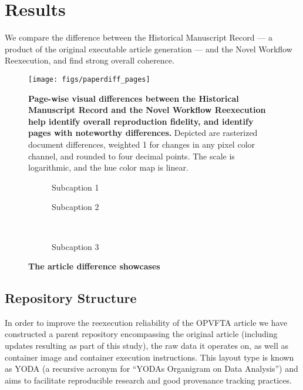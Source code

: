 \section{Results}
We compare the difference between the Historical Manuscript Record — a product of the original executable article generation — and the Novel Workflow Reexecution, and find strong overall coherence.

\begin{figure}
	\centering
	\texttt{[image: figs/paperdiff\_pages]}
	\caption{
		\textbf{Page-wise visual differences between the Historical Manuscript Record and the Novel Workflow Reexecution help identify overall reproduction fidelity, and identify pages with noteworthy differences.}
		Depicted are rasterized document differences, weighted 1 for changes in any pixel color channel, and rounded to four decimal points.
		The scale is logarithmic, and the hue color map is linear.
	}
	\label{fig:paperdiff_pages}
\end{figure}

\begin{figure}
	\centering
	\begin{subfigure}{0.4\textwidth}
		\caption{
			Subcaption 1
		}
		\label{fig:diff_date}
	\end{subfigure}
	\hfill
	\begin{subfigure}{0.4\textwidth}
		\caption{
			Subcaption 2
		}
		\label{fig:diff_text}
	\end{subfigure}
	\\
	\vspace{1em}
	\begin{subfigure}{0.99\textwidth}
		\caption{
			Subcaption 3
		}
		\label{fig:diff_fig}
	\end{subfigure}
	\caption{
		\textbf{The article difference showcases }
	}
\end{figure}


\subsection{Repository Structure}
In order to improve the reexecution reliability of the OPVFTA article we have constructed a parent repository encompassing the original article (including updates resulting as part of this study), the raw data it operates on, as well as container image and container execution instructions.
This layout type is known as YODA (a recursive acronym for “YODAs Organigram on Data Analysis”) and aims to facilitate reproducible research and good provenance tracking practices.

